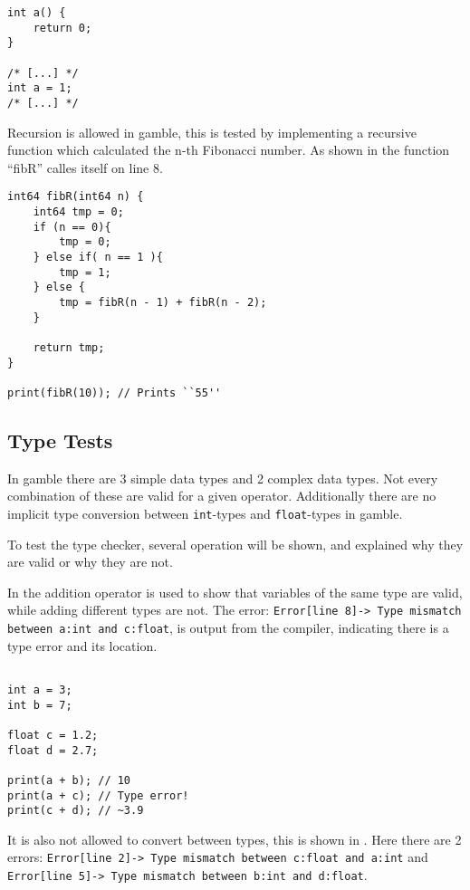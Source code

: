 \begin{lstlisting}[caption={Example of a redeclaration error in \gls{gamble}},label={lst:scope5},frame=tb]
int a() {
    return 0;
}

/* [...] */
int a = 1;
/* [...] */
\end{lstlisting}

Recursion is allowed in \gls{gamble}, this is tested by implementing a recursive function which calculated the n-th Fibonacci number.
As shown in  the function ``fibR'' calles itself on line 8. 

\begin{lstlisting}[caption={Recursive Fibonacci in \gls{gamble}},label={lst:fibR},frame=tb]
int64 fibR(int64 n) {
    int64 tmp = 0;
    if (n == 0){
        tmp = 0;
    } else if( n == 1 ){
        tmp = 1;
    } else {
        tmp = fibR(n - 1) + fibR(n - 2);
    }

    return tmp;
}

print(fibR(10)); // Prints ``55''
\end{lstlisting}

\subsection*{Type Tests}
In \gls{gamble} there are 3 simple data types and 2 complex data types. 
Not every combination of these are valid for a given operator. 
Additionally there are no implicit type conversion between \texttt{int}-types and \texttt{float}-types in \gls{gamble}.

To test the type checker, several operation will be shown, and explained why they are valid or why they are not.

In  the addition operator is used to show that variables of the same type are valid, while adding different types are not. 
The error: \texttt{Error[line    8]-> Type mismatch between a:int and c:float}, is output from the compiler, indicating there is a type error and its location. 
\begin{lstlisting}[caption={Addition in \gls{gamble} to demonstrate the type checker.},label={lst:type1},frame=tb]

int a = 3;
int b = 7;

float c = 1.2;
float d = 2.7;

print(a + b); // 10
print(a + c); // Type error!
print(c + d); // ~3.9 
\end{lstlisting}

It is also not allowed to convert between types, this is shown in .
Here there are 2 errors: \texttt{Error[line    2]-> Type mismatch between c:float and a:int} and \texttt{Error[line    5]-> Type mismatch between b:int and d:float}.

